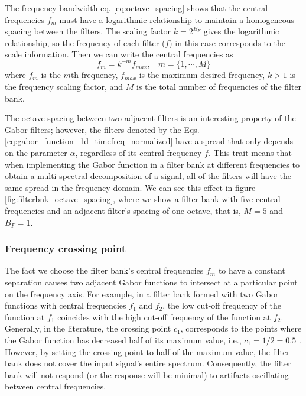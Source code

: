 \documentclass[journal]{IEEEtran}
\begin{document}
The frequency bandwidth eq. \eqref{eq:octave_spacing} shows that the central frequencies $f_m$ must have a logarithmic relationship to maintain a homogeneous spacing between the filters. The scaling factor $k=2^{B_F}$ gives the logarithmic relationship, so the frequency of each filter ($f$) in this case corresponds to the scale information. Then we can write the central frequencies as
\begin{equation}
	f_m = k^{-m} f_{max}\textrm{,} \quad m = \{1, \cdots, M\} \label{eq:filterbank_frequencies}
\end{equation} 
where $f_m$ is the $m$th frequency, $f_{max}$ is the maximum desired frequency, $k>1$ is the frequency scaling factor, and $M$ is the total number of frequencies of the filter bank.

The octave spacing between two adjacent filters is an interesting property of the Gabor filters; however, the filters denoted by the Eqs. \eqref{eq:gabor_function_1d_timefreq_normalized} have a spread that only depends on the parameter $\alpha$, regardless of its central frequency $f$. This trait means that when implementing the Gabor function in a filter bank at different frequencies to obtain a multi-spectral decomposition of a signal, all of the filters will have the same spread in the frequency domain. We can see this effect in figure \ref{fig:filterbnk_octave_spacing}, where we show a filter bank with five central frequencies and an adjacent filter's spacing of one octave, that is, $M=5$ and $B_F = 1$. 


\subsubsection{Frequency crossing point}
The fact we choose the filter bank's central frequencies $f_m$ to have a constant separation causes two adjacent Gabor functions to intersect at a particular point on the frequency axis. For example, in a filter bank formed with two Gabor functions with central frequencies $f_1$ and $f_2$, the low cut-off frequency of the function at $f_1$ coincides with the high cut-off frequency of the function at $f_2$. Generally, in the literature, the crossing point $c_1$, corresponds to the points where the Gabor function has decreased half of its maximum value, i.e., $c_1= 1/2=0.5$ \cite{Granlund:CGIP:1978}. However, by setting the crossing point to half of the maximum value, the filter bank does not cover the input signal's entire spectrum. Consequently, the filter bank will not respond (or the response will be minimal) to artifacts oscillating between central frequencies.
\end{document}
